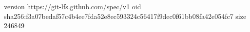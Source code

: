 version https://git-lfs.github.com/spec/v1
oid sha256:f3a07bedaf57c4b4ee7fda52e8ec593324c56417f9dec0f61bb08fa42e054fc7
size 246849
